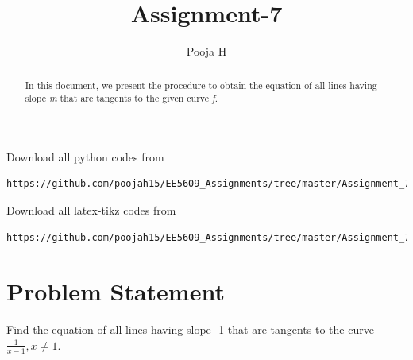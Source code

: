 \documentclass[journal,12pt,twocolumn]{IEEEtran}
\begin{document}
\let\vec\mathbf
\renewcommand{\thefigure}{\theproblem}
\def\putbox#1#2#3{\makebox[0in][l]{\makebox[#1][l]{}\raisebox{\baselineskip}[0in][0in]{\raisebox{#2}[0in][0in]{#3}}}}
     \def\rightbox#1{\makebox[0in][r]{#1}}
     \def\centbox#1{\makebox[0in]{#1}}
     \def\topbox#1{\raisebox{-\baselineskip}[0in][0in]{#1}}
     \def\midbox#1{\raisebox{-0.5\baselineskip}[0in][0in]{#1}}
\vspace{3cm}
\title{Assignment-7}
\author{Pooja H \\ }
\maketitle
\newpage
\bigskip
\renewcommand{\thefigure}{\theenumi}
\renewcommand{\thetable}{\theenumi}
\begin{abstract}
In this document, we present the procedure to obtain the equation of all lines having slope \textsl{m} that are tangents to the given curve \textsl{f}.
\end{abstract}
Download all python codes from 
\begin{lstlisting}
https://github.com/poojah15/EE5609_Assignments/tree/master/Assignment_7
\end{lstlisting}
Download all latex-tikz codes from 
\begin{lstlisting}
https://github.com/poojah15/EE5609_Assignments/tree/master/Assignment_7
\end{lstlisting}


\section{Problem Statement}
Find the equation of all lines having slope -1 that are tangents to the curve $\frac{1}{x-1}, x \neq 1$.
\end{document}
